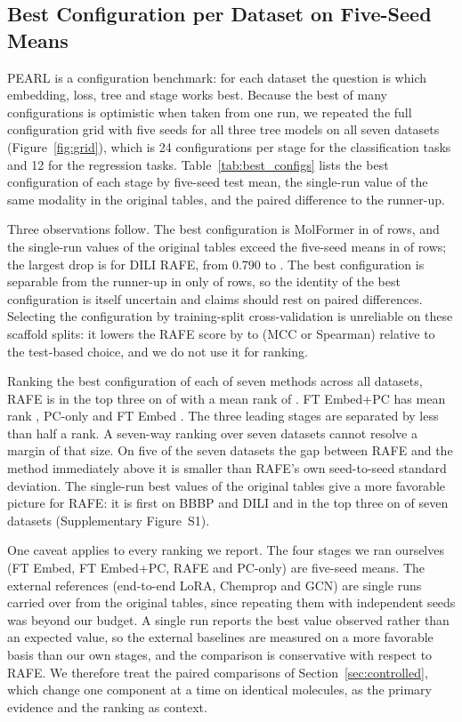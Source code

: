 \documentclass[pdflatex,sn-basic]{sn-jnl}%
\begin{document}
\FloatBarrier
\subsection{Best Configuration per Dataset on Five-Seed Means}\label{sec:best_configs}
PEARL is a configuration benchmark: for each dataset the question is which embedding, loss, tree and stage works best. Because the best of many configurations is optimistic when taken from one run, we repeated the full configuration grid with five seeds for all three tree models on all seven datasets (Figure~\ref{fig:grid}), which is 24 configurations per stage for the classification tasks and 12 for the regression tasks. Table~\ref{tab:best_configs} lists the best configuration of each stage by five-seed test mean, the single-run value of the same modality in the original tables, and the paired difference to the runner-up.

Three observations follow. The best configuration is MolFormer in \nmf{} of \nrows{} rows, and the single-run values of the original tables exceed the five-seed means in \nsr{} of \nrows{} rows; the largest drop is for DILI RAFE, from 0.790 to \mDILIRAFE{}. The best configuration is separable from the runner-up in only \nsep{} of \nrows{} rows, so the identity of the best configuration is itself uncertain and claims should rest on paired differences. Selecting the configuration by training-split cross-validation is unreliable on these scaffold splits: it lowers the RAFE score by \gaplo{} to \gaphi{} (MCC or Spearman) relative to the test-based choice, and we do not use it for ranking.

Ranking the best configuration of each of seven methods across all \nds{} datasets, RAFE is in the top three on \ntop{} of \nds{} with a mean rank of \mrankRAFE{}. FT Embed+PC has mean rank \mrankFTPC{}, PC-only \mrankPC{} and FT Embed \mrankFT{}. The three leading stages are separated by less than half a rank. A seven-way ranking over seven datasets cannot resolve a margin of that size. On five of the seven datasets the gap between RAFE and the method immediately above it is smaller than RAFE's own seed-to-seed standard deviation. The single-run best values of the original tables give a more favorable picture for RAFE: it is first on BBBP and DILI and in the top three on \srtop{} of seven datasets (Supplementary Figure~S1).

One caveat applies to every ranking we report. The four stages we ran ourselves (FT Embed, FT Embed+PC, RAFE and PC-only) are five-seed means. The external references (end-to-end LoRA, Chemprop and GCN) are single runs carried over from the original tables, since repeating them with independent seeds was beyond our budget. A single run reports the best value observed rather than an expected value, so the external baselines are measured on a more favorable basis than our own stages, and the comparison is conservative with respect to RAFE. We therefore treat the paired comparisons of Section~\ref{sec:controlled}, which change one component at a time on identical molecules, as the primary evidence and the ranking as context.
\end{document}
